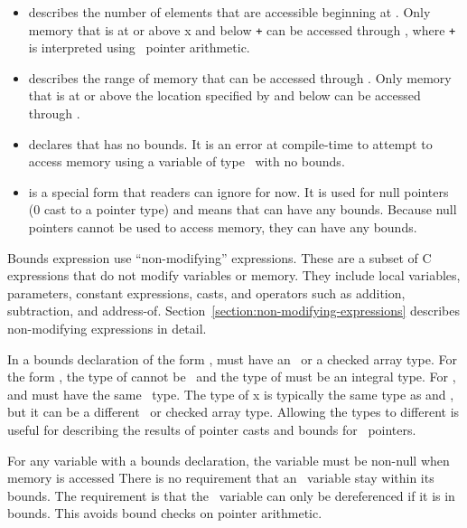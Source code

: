 \begin{itemize}
\item
   describes the number of
  elements that are accessible beginning at . Only memory that
  is at or above x and below  \texttt{+}  can be
  accessed through , where  \texttt{+}  is
  interpreted using \arrayptr\ pointer arithmetic.
\item
  describes the range of memory that can be accessed through .
  Only memory that is at or above the location specified by 
  and below  can be accessed through .
\item
   declares that  has no bounds.
  It is an error at compile-time to attempt to access memory using a
  variable of type \arrayptr\ with no bounds.
\item
   is a special form that readers can
  ignore for now. It is used for null pointers (0 cast to a pointer
  type) and means that  can have any bounds. Because null
  pointers cannot be used to access memory, they can have any bounds.
\end{itemize}

Bounds expression use ``non-modifying'' expressions. These are a subset
of C expressions that do not modify variables or memory. They include
local variables, parameters, constant expressions, casts, and operators
such as addition, subtraction, and address-of. 
Section~\ref{section:non-modifying-expressions}  describes
non-modifying expressions in detail.

In a bounds declaration of the form ,
 must have an \arrayptr\ or a checked array type. 
For the form  ,  the type of 
 cannot be \arrayptrvoid\ and the type of  must be an integral type. 
For ,  and
 must have the same \arrayptr\ type. The type of x is
typically the same type as  and , but it can be a
different \arrayptr\ or checked array type. Allowing the types
to different is useful for describing the results of pointer casts and
bounds for \arrayptrvoid\ pointers.

For any variable with a bounds declaration, the variable must be
non-null when memory is accessed There is no requirement that an
\arrayptr\ variable stay within its bounds. The requirement is
that the \arrayptr\ variable can only be dereferenced if it is
in bounds. This avoids bound checks on pointer arithmetic.

